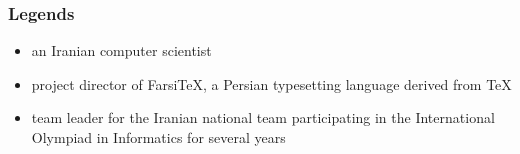 \documentclass{../c-lecture}
\begin{document}
\begin{frame}
  \frametitle{Legends}
  \begin{itemize}
    \item an Iranian computer scientist
    \item project director of FarsiTeX, a Persian typesetting language derived from TeX
    \item team leader for the Iranian national team participating in the International Olympiad in Informatics for several years
  \end{itemize}
\end{frame}
\end{document}
